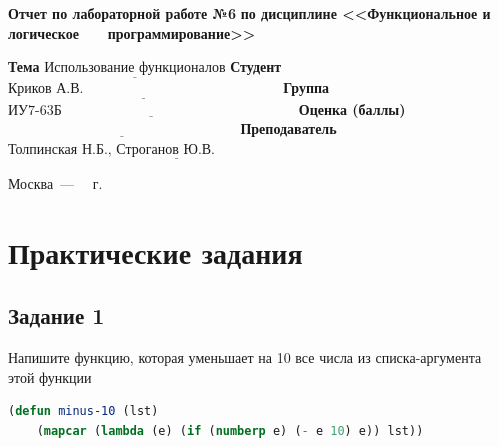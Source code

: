 \documentclass[12pt]{report}
\begin{document}
\begin{titlepage}
		\begin{center}
			\noindent\begin{minipage}{1.1\textwidth}\centering
				\Large\textbf{  Отчет по лабораторной работе №6}\newline
				\textbf{по дисциплине <<Функциональное и логическое}\newline
				\textbf{~~~программирование>>}\newline\newline
			\end{minipage}
		\end{center}
		
		\noindent\textbf{Тема} $\underline{\text{Использование функционалов}}$\newline\newline
		\noindent\textbf{Студент} $\underline{\text{Криков А.В.~~~~~~~~~~~~~~~~~~~~~~~~~~~~~~~~~~~~~~~~~~}}$\newline\newline
		\noindent\textbf{Группа} $\underline{\text{ИУ7-63Б~~~~~~~~~~~~~~~~~~~~~~~~~~~~~~~~~~~~~~~~~~~~~~~~~~}}$\newline\newline
		\noindent\textbf{Оценка (баллы)} $\underline{\text{~~~~~~~~~~~~~~~~~~~~~~~~~~~~~~~~~~~~~~~~~~~~~~~~~}}$\newline\newline
		\noindent\textbf{Преподаватель} $\underline{\text{Толпинская Н.Б., Строганов Ю.В.~~~~~~~~~~~~~~~~~~~~~~~~~~~~}}$\newline\newline\newline
		
		\begin{center}
			\vfill
			Москва~---~\the\year
			~г.
		\end{center}
	\end{titlepage}
	
	


\chapter*{Практические задания}

	
\section*{Задание 1}
Напишите функцию, которая уменьшает на 10 все числа из списка-аргумента этой функции

\begin{lstlisting}[language=Lisp]
(defun minus-10 (lst)
	(mapcar (lambda (e) (if (numberp e) (- e 10) e)) lst))  
\end{lstlisting}
\end{document}
